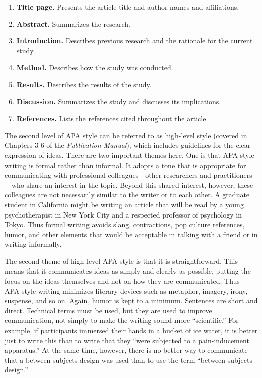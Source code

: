 \documentclass[
]{krantz}
\providecommand{\tightlist}{%
  \setlength{\itemsep}{0pt}\setlength{\parskip}{0pt}}
\begin{document}
\begin{enumerate}
\def\labelenumi{\arabic{enumi}.}
\tightlist
\item
  \textbf{Title page.} Presents the article title and author names and affiliations.
\item
  \textbf{Abstract.} Summarizes the research.
\item
  \textbf{Introduction.} Describes previous research and the rationale for the current study.
\item
  \textbf{Method.} Describes how the study was conducted.
\item
  \textbf{Results.} Describes the results of the study.
\item
  \textbf{Discussion.} Summarizes the study and discusses its implications.
\item
  \textbf{References.} Lists the references cited throughout the article.
\end{enumerate}

The second level of APA style can be referred to as \protect\hyperlink{high-level-style}{high-level style} (covered in Chapters 3-6 of the \emph{Publication Manual}), which includes guidelines for the clear expression of ideas. There are two important themes here. One is that APA-style writing is formal rather than informal. It adopts a tone that is appropriate for communicating with professional colleagues---other researchers and practitioners---who share an interest in the topic. Beyond this shared interest, however, these colleagues are not necessarily similar to the writer or to each other. A graduate student in California might be writing an article that will be read by a young psychotherapist in New York City and a respected professor of psychology in Tokyo. Thus formal writing avoids slang, contractions, pop culture references, humor, and other elements that would be acceptable in talking with a friend or in writing informally.

The second theme of high-level APA style is that it is straightforward. This means that it communicates ideas as simply and clearly as possible, putting the focus on the ideas themselves and not on how they are communicated. Thus APA-style writing minimizes literary devices such as metaphor, imagery, irony, suspense, and so on. Again, humor is kept to a minimum. Sentences are short and direct. Technical terms must be used, but they are used to improve communication, not simply to make the writing sound more ``scientific.'' For example, if participants immersed their hands in a bucket of ice water, it is better just to write this than to write that they ``were subjected to a pain-inducement apparatus.'' At the same time, however, there is no better way to communicate that a between-subjects design was used than to use the term ``between-subjects design.''
\end{document}
